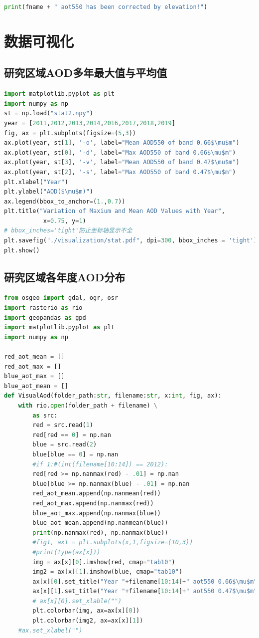 \documentclass{ctexart}
\begin{document}
\begin{sloppypar}
\begin{appendices}
\begin{lstlisting}[frame=single, language=Python, basicstyle={\ttfamily}, label=ele-corr, caption={对AOD的高程纠正}]
    print(fname + " aot550 has been corrected by elevation!")
\end{lstlisting}
\section{数据可视化}
\subsection{研究区域AOD多年最大值与平均值}
\begin{lstlisting}[frame=single, language=Python, basicstyle={\ttfamily}, label=aod-mean-max, caption={研究区域AOD多年最大值与平均值}]
import matplotlib.pyplot as plt
import numpy as np
st = np.load("stat2.npy")
year = [2011,2012,2013,2014,2016,2017,2018,2019]
fig, ax = plt.subplots(figsize=(5,3))
ax.plot(year, st[1], '-o', label="Mean AOD550 of band 0.66$\mu$m")
ax.plot(year, st[0], '-d', label="Max AOD550 of band 0.66$\mu$m")
ax.plot(year, st[3], '-v', label="Mean AOD550 of band 0.47$\mu$m")
ax.plot(year, st[2], '-s', label="Max AOD550 of band 0.47$\mu$m")
plt.xlabel("Year")
plt.ylabel("AOD($\mu$m)")
ax.legend(bbox_to_anchor=(1.,0.7))
plt.title("Variation of Maxium and Mean AOD Values with Year",
           x=0.75, y=1)
# bbox_inches='tight'防止坐标轴显示不全
plt.savefig("./visualization/stat.pdf", dpi=300, bbox_inches = 'tight')
plt.show()
\end{lstlisting}
\subsection{研究区域各年度AOD分布}
\begin{lstlisting}[frame=single, language=Python, basicstyle={\ttfamily}, label=aod-distribute, caption={研究区域各年度AOD分布}]
from osgeo import gdal, ogr, osr
import rasterio as rio
import geopandas as gpd
import matplotlib.pyplot as plt
import numpy as np

red_aot_mean = []
red_aot_max = []
blue_aot_max = []
blue_aot_mean = []
def VisualAod(folder_path:str, filename:str, x:int, fig, ax):
    with rio.open(folder_path + filename) \
        as src:
        red = src.read(1)
        red[red == 0] = np.nan
        blue = src.read(2)
        blue[blue == 0] = np.nan
        #if 1:#(int(filename[10:14]) == 2012):
        red[red >= np.nanmax(red) - .01] = np.nan
        blue[blue >= np.nanmax(blue) - .01] = np.nan
        red_aot_mean.append(np.nanmean(red))
        red_aot_max.append(np.nanmax(red))
        blue_aot_max.append(np.nanmax(blue))
        blue_aot_mean.append(np.nanmean(blue))
        print(np.nanmax(red), np.nanmax(blue))
        #fig1, ax1 = plt.subplots(x,1,figsize=(10,3))
        #print(type(ax[x]))
        img = ax[x][0].imshow(red, cmap="tab10")
        img2 = ax[x][1].imshow(blue, cmap="tab10")
        ax[x][0].set_title("Year "+filename[10:14]+" aot550 0.66$\mu$m")
        ax[x][1].set_title("Year "+filename[10:14]+" aot550 0.47$\mu$m")
        # ax[x][0].set_xlable("")
        plt.colorbar(img, ax=ax[x][0])
        plt.colorbar(img2, ax=ax[x][1])
    #ax.set_xlabel("")


\end{lstlisting}
\end{appendices}
\end{sloppypar}
\end{document}
